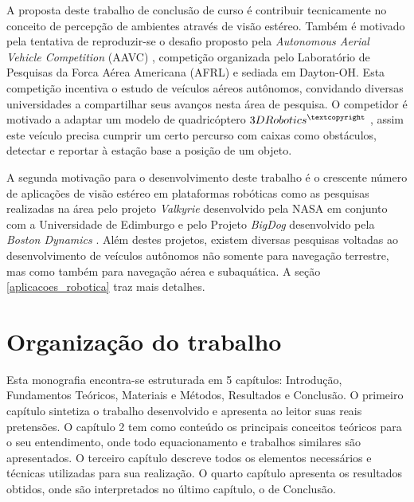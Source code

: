 A proposta deste trabalho de conclusão de curso é contribuir tecnicamente no conceito de percepção de ambientes através de visão estéreo. Também é motivado pela tentativa de reproduzir-se o desafio proposto pela \textit{Autonomous Aerial Vehicle Competition} (AAVC) \cite{AAVC}, competição organizada pelo Laboratório de Pesquisas da Forca Aérea Americana (AFRL) e sediada em Dayton-OH. Esta competição incentiva o estudo de veículos aéreos autônomos, convidando diversas universidades a compartilhar seus avanços nesta área de pesquisa. O competidor é motivado a adaptar um modelo de quadricóptero $3DRobotics^{\textcopyright}$ \cite{3DR}, assim este veículo precisa cumprir um certo percurso com caixas como obstáculos, detectar e reportar à estação base a posição de um objeto.

A segunda motivação para o desenvolvimento deste trabalho é o crescente número de aplicações de visão estéreo em plataformas robóticas como as pesquisas realizadas na área pelo projeto \textit{Valkyrie} desenvolvido pela NASA em conjunto com a Universidade de Edimburgo \cite{ValkyrieRobot} e pelo Projeto \textit{BigDog} desenvolvido pela \textit{Boston Dynamics} \cite{BigDog}. Além destes projetos, existem diversas pesquisas voltadas ao desenvolvimento de veículos autônomos não somente para navegação terrestre, mas como também para navegação aérea e subaquática. A seção \ref{aplicacoes_robotica} traz mais detalhes.


\section{Organização do trabalho}

Esta monografia encontra-se estruturada em 5 capítulos: Introdução, Fundamentos Teóricos, Materiais e Métodos, Resultados e Conclusão. O primeiro capítulo sintetiza o trabalho desenvolvido e apresenta ao leitor suas reais pretensões. O capítulo 2 tem como conteúdo os principais conceitos teóricos para o seu entendimento, onde todo equacionamento e trabalhos similares são apresentados. O terceiro capítulo descreve todos os elementos necessários e técnicas utilizadas para sua realização. O quarto capítulo apresenta os resultados obtidos, onde são interpretados no último capítulo, o de Conclusão.

